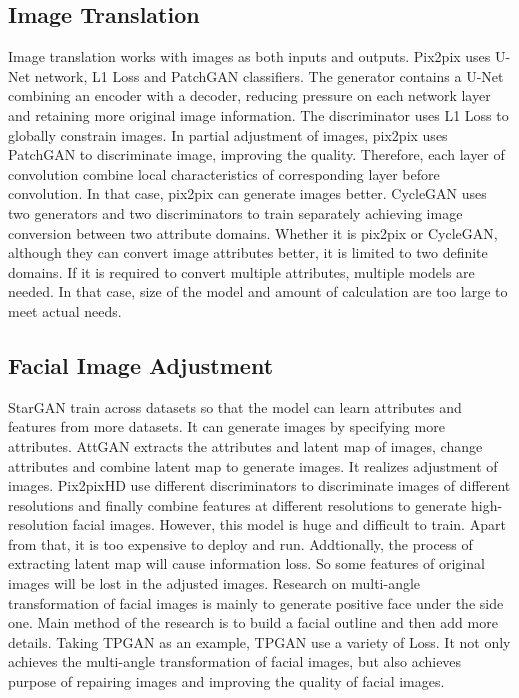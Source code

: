 \subsection{Image Translation}
Image translation works with images as both inputs and outputs.
Pix2pix uses U-Net network, L1 Loss and PatchGAN classifiers.
The generator contains a U-Net combining an encoder with a decoder,
    reducing pressure on each network layer and retaining more original image information.
The discriminator uses L1 Loss to globally constrain images.
In partial adjustment of images,
    pix2pix uses PatchGAN to discriminate image, improving the quality.
Therefore, each layer of convolution combine local characteristics of corresponding layer before convolution.
    In that case, pix2pix can generate images better.
CycleGAN uses two generators and two discriminators to train separately achieving image conversion between two attribute domains.
Whether it is pix2pix or CycleGAN,
    although they can convert image attributes better,
    it is limited to two definite domains.
If it is required to convert multiple attributes, multiple models are needed.
In that case, size of the model and amount of calculation are too large to meet actual needs.

\subsection{Facial Image Adjustment}
StarGAN train across datasets so that the model can learn attributes and features from more datasets.
It can generate images by specifying more attributes.
AttGAN extracts the attributes and latent map of images,
    change attributes and combine latent map to generate images.
It realizes adjustment of images.
Pix2pixHD use different discriminators to discriminate images of different resolutions
    and finally combine features at different resolutions to generate high-resolution facial images.
However, this model is huge and difficult to train.
Apart from that, it is too expensive to deploy and run.
Addtionally, the process of extracting latent map will cause information loss.
So some features of original images will be lost in the adjusted images.
Research on multi-angle transformation of facial images is mainly to generate positive face under the side one.
Main method of the research is to build a facial outline and then add more details.
Taking TPGAN as an example, TPGAN use a variety of Loss.
It not only achieves the multi-angle transformation of facial images,
    but also achieves purpose of repairing images and improving the quality of facial images.


